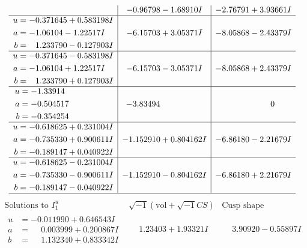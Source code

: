 \documentclass[1p]{elsarticle_modified}
\theoremstyle{definition}
\newcommand{\I}{\sqrt{-1}}
\begin{document}
$$\begin{array}{c|c|c}
 & -0.96798 - 1.68910 I & -2.76791 + 3.93661 I \\ \hline\begin{aligned}
u &= -0.371645 + 0.583198 I \\
a &= -1.06104 - 1.22517 I \\
b &= \phantom{-}1.233790 - 0.127903 I\end{aligned}
 & -6.15703 + 3.05371 I & -8.05868 - 2.43379 I \\ \hline\begin{aligned}
u &= -0.371645 - 0.583198 I \\
a &= -1.06104 + 1.22517 I \\
b &= \phantom{-}1.233790 + 0.127903 I\end{aligned}
 & -6.15703 - 3.05371 I & -8.05868 + 2.43379 I \\ \hline\begin{aligned}
u &= -1.33914\phantom{ +0.000000I} \\
a &= -0.504517\phantom{ +0.000000I} \\
b &= -0.354254\phantom{ +0.000000I}\end{aligned}
 & -3.83494\phantom{ +0.000000I} & \phantom{-0.000000 } 0 \\ \hline\begin{aligned}
u &= -0.618625 + 0.231004 I \\
a &= -0.735330 + 0.900611 I \\
b &= -0.189147 + 0.040922 I\end{aligned}
 & -1.152910 + 0.804162 I & -6.86180 - 2.21679 I \\ \hline\begin{aligned}
u &= -0.618625 - 0.231004 I \\
a &= -0.735330 - 0.900611 I \\
b &= -0.189147 - 0.040922 I\end{aligned}
 & -1.152910 - 0.804162 I & -6.86180 + 2.21679 I\\
 \hline 
 \end{array}$$\newpage$$\begin{array}{c|c|c}  
\text{Solutions to }I^u_{1}& \I (\text{vol} + \sqrt{-1}CS) & \text{Cusp shape}\\
 \hline 
\begin{aligned}
u &= -0.011990 + 0.646543 I \\
a &= \phantom{-}0.003999 + 0.200867 I \\
b &= \phantom{-}1.132340 + 0.833342 I\end{aligned}
 & \phantom{-}1.23403 + 1.93321 I & \phantom{-}3.90920 - 0.55897 I \\ \hline\begin{aligned}

\end{aligned}
\end{array}$$
\end{document}
